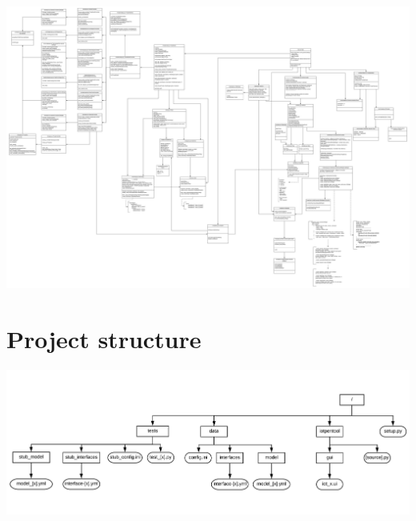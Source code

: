 \documentclass{article}
\begin{document}
\begin{center}
	\begin{sideways}%
		\begin{minipage}{0.92\textheight}
			\includegraphics[width=\linewidth,keepaspectratio]{overall_class_diagram}
			\label{fig:xx}
		\end{minipage}
	\end{sideways}
\end{center}

\section{Project structure}\label{sec:appendix-proj-struct}

\begin{center}
	\begin{sideways}%
		\begin{minipage}{0.92\textheight}
			\includegraphics[width=\linewidth,keepaspectratio]{project_layout}
			\label{fig:xx}
		\end{minipage}
	\end{sideways}
\end{center}
\end{document}
